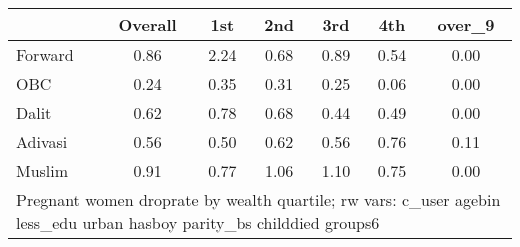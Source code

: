 \begin{tabular}{l*{6}{c}}
\toprule
            &\multicolumn{1}{c}{Overall}&\multicolumn{1}{c}{1st}&\multicolumn{1}{c}{2nd}&\multicolumn{1}{c}{3rd}&\multicolumn{1}{c}{4th}&\multicolumn{1}{c}{over\_9}\\
\midrule
\midrule
Forward     &        0.86&        2.24&        0.68&        0.89&        0.54&        0.00\\
OBC         &        0.24&        0.35&        0.31&        0.25&        0.06&        0.00\\
Dalit       &        0.62&        0.78&        0.68&        0.44&        0.49&        0.00\\
Adivasi     &        0.56&        0.50&        0.62&        0.56&        0.76&        0.11\\
Muslim      &        0.91&        0.77&        1.06&        1.10&        0.75&        0.00\\
\bottomrule
\multicolumn{7}{l}{\footnotesize Pregnant women droprate by wealth quartile; rw vars: c\_user agebin less\_edu urban hasboy parity\_bs childdied groups6}\\
\end{tabular}
